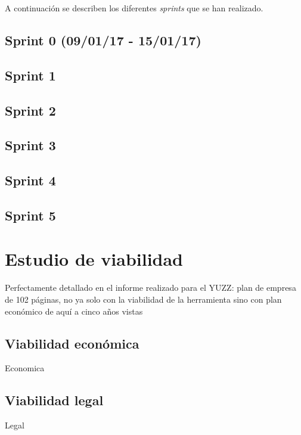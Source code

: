 A continuación se describen los diferentes \emph{sprints} que se han
realizado.


\subsection{Sprint 0 (09/01/17 -
15/01/17)}\label{sprint-0}

\subsection{Sprint 1}

\subsection{Sprint 2}
\subsection{Sprint 3}
\subsection{Sprint 4}
\subsection{Sprint 5}


\section{Estudio de viabilidad}\label{estudio-viabilidad}
Perfectamente detallado en el informe realizado para el YUZZ: plan de empresa de 102 páginas, no ya solo con la viabilidad de la herramienta sino con plan económico de aquí a cinco años vistas 


\subsection{Viabilidad económica}\label{viabilidad-economica}
Economica

\subsection{Viabilidad legal}\label{viabilidad-legal}
Legal


